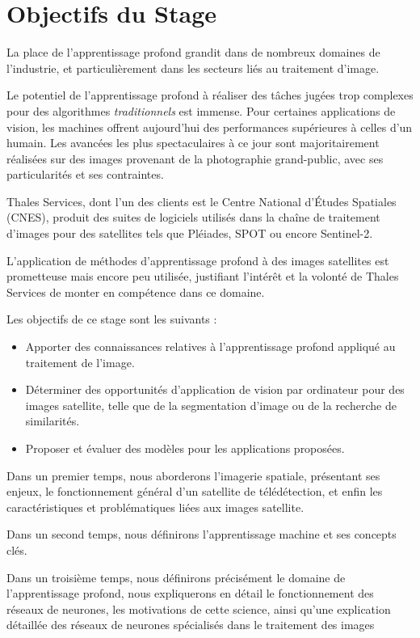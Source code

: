 \documentclass[a4paper, 11pt]{report}
\begin{document}
\section{Objectifs du Stage}
La place de l'apprentissage profond grandit dans de nombreux domaines de l'industrie, et particulièrement dans les secteurs liés au traitement d'image.

Le potentiel de l'apprentissage profond à réaliser des tâches jugées trop complexes pour des algorithmes \emph{traditionnels} est immense.
Pour certaines applications de vision, les machines offrent aujourd'hui des performances supérieures à celles d'un humain.
Les avancées les plus spectaculaires à ce jour sont majoritairement réalisées sur des images provenant de la photographie grand-public, avec ses particularités et ses contraintes.

Thales Services, dont l'un des clients est le Centre National d'Études Spatiales (CNES), produit des suites de logiciels utilisés dans la chaîne de traitement d'images pour des satellites tels que Pléiades, SPOT ou encore Sentinel-2.

L'application de méthodes d'apprentissage profond à des images satellites est prometteuse mais encore peu utilisée, justifiant l'intérêt et la volonté de Thales Services de monter en compétence dans ce domaine.

Les objectifs de ce stage sont les suivants :
\begin{itemize}
	\item Apporter des connaissances relatives à l'apprentissage profond appliqué au traitement de l'image.
	\item Déterminer des opportunités d'application de vision par ordinateur pour des images satellite, telle que de la segmentation d'image ou de la recherche de similarités.
	\item Proposer et évaluer des modèles pour les applications proposées.
\end{itemize}

Dans un premier temps, nous aborderons l'imagerie spatiale, présentant ses enjeux, le fonctionnement général d'un satellite de télédétection, et enfin les caractéristiques et problématiques liées aux images satellite.

Dans un second temps, nous définirons l'apprentissage machine et ses concepts clés.

Dans un troisième temps, nous définirons précisément le domaine de l'apprentissage profond, nous expliquerons en détail le fonctionnement des réseaux de neurones, les motivations de cette science, ainsi qu'une explication détaillée des réseaux de neurones spécialisés dans le traitement des images
\end{document}
